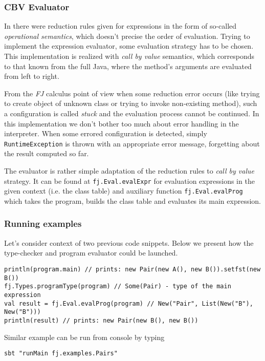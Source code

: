 \documentclass{article}[12pt]
\begin{document}
\subsubsection{CBV Evaluator}

In \cite{fj} there were reduction rules given for expressions in
the form of so-called \emph{operational semantics}, which doesn't
precise the order of evaluation. Trying to implement the expression
evaluator, some evaluation strategy has to be chosen. This
implementation is realized with \emph{call by value} semantics,
which corresponds to that known from the full Java, where
the method's arguments are evaluated from left to right.

From the \emph{FJ} calculus point of view when some reduction error
occurs (like trying to create object of unknown class or trying to
invoke non-existing method), such a configuration is called
\emph{stuck} and the evaluation process cannot be continued.
In this implementation we don't bother too much about error
handling in the interpreter. When some errored configuration is
detected, simply \texttt{RuntimeException} is thrown with
an appropriate error message, forgetting about the result
computed so far.

The evaluator is rather simple adaptation of the reduction rules to
\emph{call by value} strategy. It can be found at
\texttt{fj.Eval.evalExpr} for evaluation expressions in the given
context (i.e. the class table) and auxiliary function
\texttt{fj.Eval.evalProg} which takes the program, builds the
class table and evaluates its main expression.

\subsubsection{Running examples}

Let's consider context of two previous code snippets. Below
we present how the type-checker and program evaluator could be
launched.

\begin{verbatim}
println(program.main) // prints: new Pair(new A(), new B()).setfst(new B())
fj.Types.programType(program) // Some(Pair) - type of the main expression
val result = fj.Eval.evalProg(program) // New("Pair", List(New("B"), New("B")))
println(result) // prints: new Pair(new B(), new B())
\end{verbatim}
Similar example can be run from console by typing

\begin{verbatim}
sbt "runMain fj.examples.Pairs"
\end{verbatim}
\end{document}
